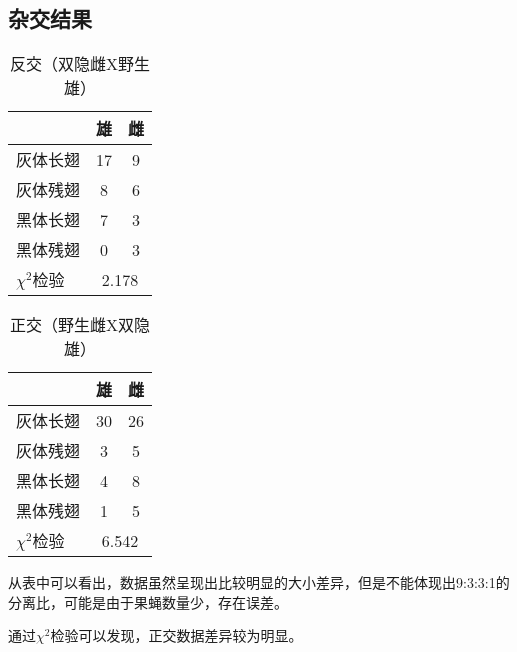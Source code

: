 \documentclass[UTF8]{article}
\begin{document}
    \subsection{杂交结果}
    \begin{table}[H]
      \begin{center}
        \caption{反交（双隐雌X野生雄）}
        \begin{tabular}{|l|c|c|}
          \hline
            & \textbf{雄} & \textbf{雌}\\
          \hline
          灰体长翅 & 17 & 9\\
          灰体残翅 & 8 & 6\\
          黑体长翅 & 7 & 3\\
          黑体残翅 & 0 & 3\\
          \hline
          $\chi^2$检验 & \multicolumn{2}{|c|}{2.178}\\
          \hline
        \end{tabular}
      \end{center}
    \end{table}
    \begin{table}[H]
      \begin{center}
        \caption{正交（野生雌X双隐雄）}
        \begin{tabular}{|l|c|c|}
          \hline
            & \textbf{雄} & \textbf{雌}\\
          \hline
          灰体长翅 & 30 & 26\\
          灰体残翅 & 3 & 5\\
          黑体长翅 & 4 & 8\\
          黑体残翅 & 1 & 5\\
          \hline
          $\chi^2$检验 & \multicolumn{2}{|c|}{6.542}\\
          \hline
        \end{tabular}
      \end{center}
    \end{table}
    从表中可以看出，数据虽然呈现出比较明显的大小差异，但是不能体现出9:3:3:1的分离比，可能是由于果蝇数量少，存在误差。

    通过$\chi^2$检验可以发现，正交数据差异较为明显。
\end{document}
